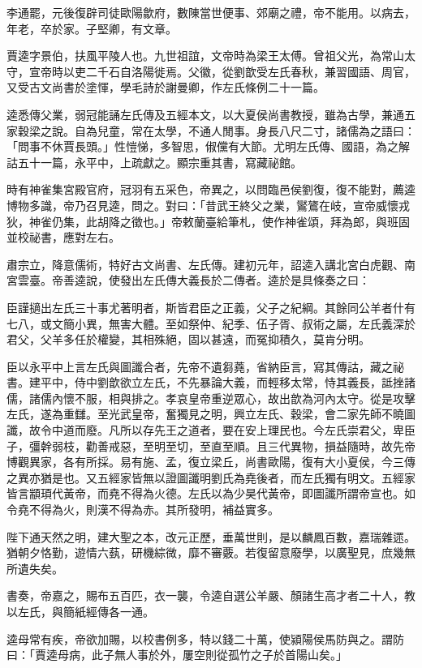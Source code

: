 \begin{pinyinscope}
李通罷，元後復辟司徒歐陽歙府，數陳當世便事、郊廟之禮，帝不能用。以病去，年老，卒於家。子堅卿，有文章。

賈逵字景伯，扶風平陵人也。九世祖誼，文帝時為梁王太傅。曾祖父光，為常山太守，宣帝時以吏二千石自洛陽徙焉。父徽，從劉歆受左氏春秋，兼習國語、周官，又受古文尚書於塗惲，學毛詩於謝曼卿，作左氏條例二十一篇。

逵悉傳父業，弱冠能誦左氏傳及五經本文，以大夏侯尚書教授，雖為古學，兼通五家穀梁之說。自為兒童，常在太學，不通人閒事。身長八尺二寸，諸儒為之語曰：「問事不休賈長頭。」性愷悌，多智思，俶儻有大節。尤明左氏傳、國語，為之解詁五十一篇，永平中，上疏獻之。顯宗重其書，寫藏祕館。

時有神雀集宮殿官府，冠羽有五采色，帝異之，以問臨邑侯劉復，復不能對，薦逵博物多識，帝乃召見逵，問之。對曰：「昔武王終父之業，鸑鷟在岐，宣帝威懷戎狄，神雀仍集，此胡降之徵也。」帝敕蘭臺給筆札，使作神雀頌，拜為郎，與班固並校祕書，應對左右。

肅宗立，降意儒術，特好古文尚書、左氏傳。建初元年，詔逵入講北宮白虎觀、南宮雲臺。帝善逵說，使發出左氏傳大義長於二傳者。逵於是具條奏之曰：

臣謹擿出左氏三十事尤著明者，斯皆君臣之正義，父子之紀綱。其餘同公羊者什有七八，或文簡小異，無害大體。至如祭仲、紀季、伍子胥、叔術之屬，左氏義深於君父，父羊多任於權變，其相殊絕，固以甚遠，而冤抑積久，莫肯分明。

臣以永平中上言左氏與圖讖合者，先帝不遺芻蕘，省納臣言，寫其傳詁，藏之祕書。建平中，侍中劉歆欲立左氏，不先暴論大義，而輕移太常，恃其義長，詆挫諸儒，諸儒內懷不服，相與排之。孝哀皇帝重逆眾心，故出歆為河內太守。從是攻擊左氏，遂為重讎。至光武皇帝，奮獨見之明，興立左氏、穀梁，會二家先師不曉圖讖，故令中道而廢。凡所以存先王之道者，要在安上理民也。今左氏崇君父，卑臣子，彊幹弱枝，勸善戒惡，至明至切，至直至順。且三代異物，損益隨時，故先帝博觀異家，各有所採。易有施、孟，復立梁丘，尚書歐陽，復有大小夏侯，今三傳之異亦猶是也。又五經家皆無以證圖讖明劉氏為堯後者，而左氏獨有明文。五經家皆言顓頊代黃帝，而堯不得為火德。左氏以為少昊代黃帝，即圖讖所謂帝宣也。如令堯不得為火，則漢不得為赤。其所發明，補益實多。

陛下通天然之明，建大聖之本，改元正歷，垂萬世則，是以麟鳳百數，嘉瑞雜遝。猶朝夕恪勤，遊情六蓺，研機綜微，靡不審覈。若復留意廢學，以廣聖見，庶幾無所遺失矣。

書奏，帝嘉之，賜布五百匹，衣一襲，令逵自選公羊嚴、顏諸生高才者二十人，教以左氏，與簡紙經傳各一通。

逵母常有疾，帝欲加賜，以校書例多，特以錢二十萬，使潁陽侯馬防與之。謂防曰：「賈逵母病，此子無人事於外，屢空則從孤竹之子於首陽山矣。」


\end{pinyinscope}
